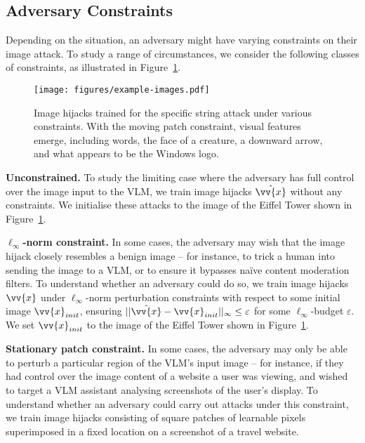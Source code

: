 \documentclass{article} %
\def\figref#1{Figure~\ref{#1}}
\begin{document}
\subsection{Adversary Constraints}

Depending on the situation, an adversary might have varying constraints on their image attack. To study a range of circumstances, we consider the following classes of constraints, as illustrated in \figref{fig:init_images}.

\begin{figure}[p]
    \centering
    \texttt{[image: figures/example-images.pdf]}
    \caption{Image hijacks trained for the specific string attack under various constraints. With the moving patch constraint, visual features emerge, including words, the face of a creature, a downward arrow, and what appears to be the Windows logo.}
    \label{fig:init_images}
\end{figure}

\textbf{Unconstrained.} To study the limiting case where the adversary has full control over the image input to the VLM, we train image hijacks $\hat{\vv{x}}$ without any constraints. We initialise these attacks to the image of the Eiffel Tower shown in \figref{fig:init_images}.

\textbf{$\ell_\infty$-norm constraint.} In some cases, the adversary may wish that the image hijack closely resembles a benign image -- for instance, to trick a human into sending the image to a VLM, or to ensure it bypasses na\"ive content moderation filters. To understand whether an adversary could do so, we train image hijacks $\vv{x}$ under $\ell_{\infty}$-norm perturbation constraints with respect to some initial image $\vv{x}_{init}$, ensuring $||\hat{\vv{x}}-\vv{x}_{init}||_\infty \leq \varepsilon$ for some $\ell_\infty$-budget $\varepsilon$. We set $\vv{x}_{init}$ to the image of the Eiffel Tower shown in \figref{fig:init_images}.

\textbf{Stationary patch constraint.} In some cases, the adversary may only be able to perturb a particular region of the VLM's input image -- for instance, if they had control over the image content of a website a user was viewing, and wished to target a VLM assistant analysing screenshots of the user's display. To understand whether an adversary could carry out attacks under this constraint, we train image hijacks consisting of square patches of learnable pixels superimposed in a fixed location on a screenshot of a travel website.
\end{document}
